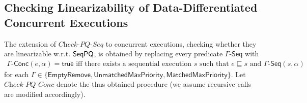 %
%
%
%

\subsection{Checking Linearizability of Data-Differentiated Concurrent Executions}\label{ssec:conc_exec}

The extension of $\textit{Check-PQ-Seq}$ to concurrent executions, checking whether they are linearizable w.r.t. $\mathsf{SeqPQ}$, is obtained by replacing every predicate $\Gamma\mathsf{\text{-}Seq}$ with
\begin{align*}
\Gamma\mathsf{\text{-}Conc}(e,\alpha) = \mathsf{true}\mbox{ iff there exists a sequential execution $s$ such that $e\sqsubseteq s$ and $\Gamma\mathsf{\text{-}Seq}(s,\alpha)$}
\end{align*}
for each $\Gamma\in \{\mathsf{EmptyRemove}, \mathsf{UnmatchedMaxPriority}, \mathsf{MatchedMaxPriority}\}$. Let $\textit{Check-PQ-Conc}$ denote the thus obtained procedure (we assume recursive calls are modified accordingly).

